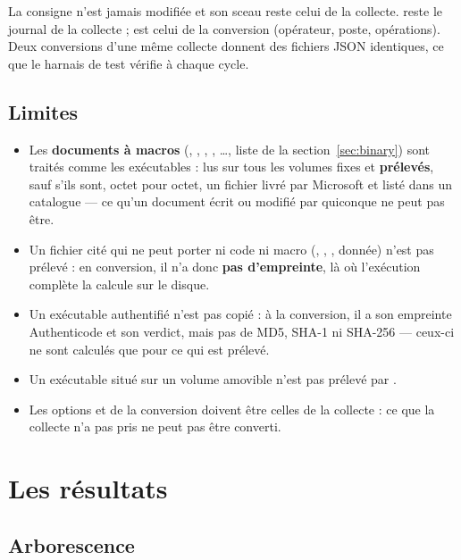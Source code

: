 \documentclass[11pt,a4paper,oneside]{report}
\begin{document}
La consigne n'est jamais modifiée et son sceau reste celui de la collecte.
 reste le journal de la collecte ;
 est celui de la conversion (opérateur, poste,
opérations). Deux conversions d'une même collecte donnent des fichiers JSON
identiques, ce que le harnais de test vérifie à chaque cycle.

\section{Limites}

\begin{itemize}
  \item Les \textbf{documents à macros} (, ,
        , , \ldots, liste de la
        section~\ref{sec:binary}) sont traités comme les exécutables : lus sur
        tous les volumes fixes et \textbf{prélevés}, sauf s'ils sont, octet pour
        octet, un fichier livré par Microsoft et listé dans un catalogue — ce
        qu'un document écrit ou modifié par quiconque ne peut pas être.
  \item Un fichier cité qui ne peut porter ni code ni macro (,
        , , donnée) n'est pas prélevé : en
        conversion, il n'a donc \textbf{pas d'empreinte}, là où l'exécution
        complète la calcule sur le disque.
  \item Un exécutable authentifié n'est pas copié : à la conversion, il a son
        empreinte Authenticode et son verdict, mais pas de MD5, SHA-1 ni
        SHA-256 — ceux-ci ne sont calculés que pour ce qui est prélevé.
  \item Un exécutable situé sur un volume amovible n'est pas prélevé par
         .
  \item Les options  et  de la conversion doivent être
        celles de la collecte : ce que la collecte n'a pas pris ne peut pas être
        converti.
\end{itemize}

\chapter{Les résultats}

\section{Arborescence}
\end{document}
